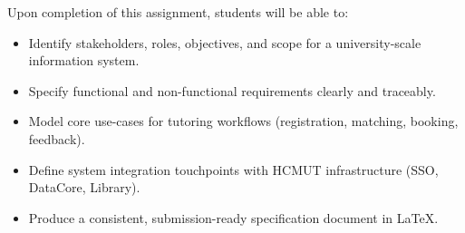 Upon completion of this assignment, students will be able to:
\begin{itemize}
  \item Identify stakeholders, roles, objectives, and scope for a university-scale information system.
  \item Specify functional and non-functional requirements clearly and traceably.
  \item Model core use-cases for tutoring workflows (registration, matching, booking, feedback).
  \item Define system integration touchpoints with HCMUT infrastructure (SSO, DataCore, Library).
  \item Produce a consistent, submission-ready specification document in \LaTeX.
\end{itemize}
